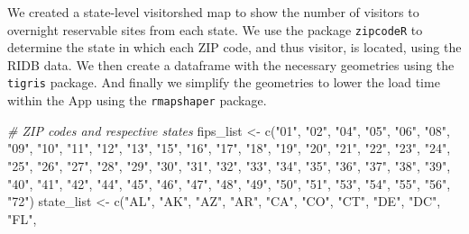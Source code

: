 \documentclass[
  11 pt,
  openany]{book}
\newenvironment{Shaded}{\begin{snugshade}}{\end{snugshade}}
\newcommand{\CommentTok}[1]{\textcolor[rgb]{0.56,0.35,0.01}{\textit{#1}}}
\newcommand{\FunctionTok}[1]{\textcolor[rgb]{0.00,0.00,0.00}{#1}}
\newcommand{\NormalTok}[1]{#1}
\newcommand{\OtherTok}[1]{\textcolor[rgb]{0.56,0.35,0.01}{#1}}
\newcommand{\StringTok}[1]{\textcolor[rgb]{0.31,0.60,0.02}{#1}}
\begin{document}
We created a state-level visitorshed map to show the number of visitors to overnight reservable sites from each state. We use the package \texttt{zipcodeR} \citep{R-zipcodeR} to determine the state in which each ZIP code, and thus visitor, is located, using the RIDB data. We then create a dataframe with the necessary geometries using the \texttt{tigris} \citep{R-tigris} package. And finally we simplify the geometries to lower the load time within the App using the \texttt{rmapshaper} \citep{R-rmapshaper} package.

\begin{Shaded}
\begin{Highlighting}[]
\CommentTok{\# ZIP codes and respective states}
\NormalTok{fips\_list }\OtherTok{\textless{}{-}} 
  \FunctionTok{c}\NormalTok{(}\StringTok{"01"}\NormalTok{, }\StringTok{"02"}\NormalTok{, }\StringTok{"04"}\NormalTok{, }\StringTok{"05"}\NormalTok{, }\StringTok{"06"}\NormalTok{, }\StringTok{"08"}\NormalTok{, }\StringTok{"09"}\NormalTok{, }\StringTok{"10"}\NormalTok{, }\StringTok{"11"}\NormalTok{, }\StringTok{"12"}\NormalTok{, }
    \StringTok{"13"}\NormalTok{, }\StringTok{"15"}\NormalTok{, }\StringTok{"16"}\NormalTok{, }\StringTok{"17"}\NormalTok{, }\StringTok{"18"}\NormalTok{, }\StringTok{"19"}\NormalTok{, }\StringTok{"20"}\NormalTok{, }\StringTok{"21"}\NormalTok{, }\StringTok{"22"}\NormalTok{, }\StringTok{"23"}\NormalTok{, }
    \StringTok{"24"}\NormalTok{, }\StringTok{"25"}\NormalTok{, }\StringTok{"26"}\NormalTok{, }\StringTok{"27"}\NormalTok{, }\StringTok{"28"}\NormalTok{, }\StringTok{"29"}\NormalTok{, }\StringTok{"30"}\NormalTok{, }\StringTok{"31"}\NormalTok{, }\StringTok{"32"}\NormalTok{, }\StringTok{"33"}\NormalTok{, }
    \StringTok{"34"}\NormalTok{, }\StringTok{"35"}\NormalTok{, }\StringTok{"36"}\NormalTok{, }\StringTok{"37"}\NormalTok{, }\StringTok{"38"}\NormalTok{, }\StringTok{"39"}\NormalTok{, }\StringTok{"40"}\NormalTok{, }\StringTok{"41"}\NormalTok{, }\StringTok{"42"}\NormalTok{, }\StringTok{"44"}\NormalTok{, }
    \StringTok{"45"}\NormalTok{, }\StringTok{"46"}\NormalTok{, }\StringTok{"47"}\NormalTok{, }\StringTok{"48"}\NormalTok{, }\StringTok{"49"}\NormalTok{, }\StringTok{"50"}\NormalTok{, }\StringTok{"51"}\NormalTok{, }\StringTok{"53"}\NormalTok{, }\StringTok{"54"}\NormalTok{, }\StringTok{"55"}\NormalTok{, }
    \StringTok{"56"}\NormalTok{, }\StringTok{"72"}\NormalTok{)}
\NormalTok{state\_list }\OtherTok{\textless{}{-}} 
  \FunctionTok{c}\NormalTok{(}\StringTok{"AL"}\NormalTok{, }\StringTok{"AK"}\NormalTok{, }\StringTok{"AZ"}\NormalTok{, }\StringTok{"AR"}\NormalTok{, }\StringTok{"CA"}\NormalTok{, }\StringTok{"CO"}\NormalTok{, }\StringTok{"CT"}\NormalTok{, }\StringTok{"DE"}\NormalTok{, }\StringTok{"DC"}\NormalTok{, }\StringTok{"FL"}\NormalTok{,}

\end{Highlighting}
\end{Shaded}
\end{document}
